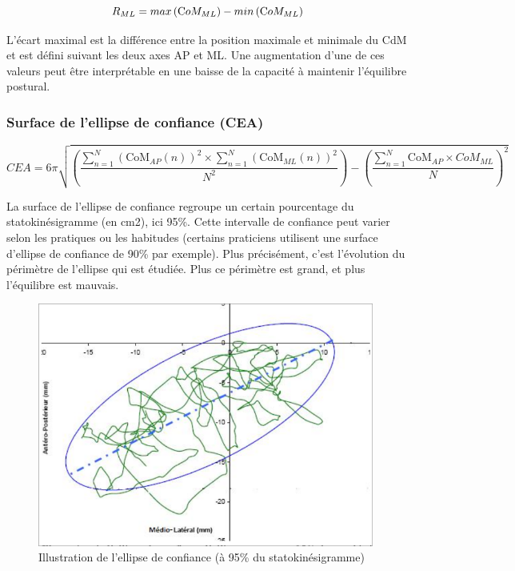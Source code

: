 \begin{equation}
  R_{ML}= max \left ( \text CoM_{ML} \right ) - min\left ( \text CoM_{ML} \right )   
  \label{eq:R_ML}
\end{equation}


L'écart maximal est la différence entre la position maximale et minimale du CdM et est défini suivant les deux axes AP et ML.
Une augmentation d'une de ces valeurs peut être interprétable en une baisse de la capacité à maintenir l'équilibre postural.

\subsubsection{Surface de l'ellipse de confiance (CEA)}

\begin{equation}
CEA= 6\pi \sqrt{ \left ( \frac{\sum_{n=1}^{N} \left (\text{CoM}_{AP}(n) \right)^2 \times \sum_{n=1}^{N} \left ( \text{CoM}_{ML}(n) \right)^2}{N^2} \right ) - \left (\frac{\sum_{n=1}^N \text{CoM}_{AP} \times CoM_{ML}}{N} \right)^2}
\label{eq:CEA}
\end{equation}

La surface de l'ellipse de confiance regroupe un certain pourcentage du statokinésigramme (en cm2), ici 95\%. 
Cette intervalle de confiance peut varier selon les pratiques ou les habitudes (certains praticiens utilisent une surface d'ellipse de confiance de 90\% par exemple). 
Plus précisément, c'est l'évolution du périmètre de l'ellipse qui est étudiée. 
Plus ce périmètre est grand, et plus l'équilibre est mauvais.

\begin{figure}[H]
    \centering
    \includegraphics[height=8cm]{images/methode/ellipse_confiance_95.png}
    \caption{Illustration de l'ellipse de confiance (à 95\% du statokinésigramme)}\label{fig:ellipse_confiance}
\end{figure}

